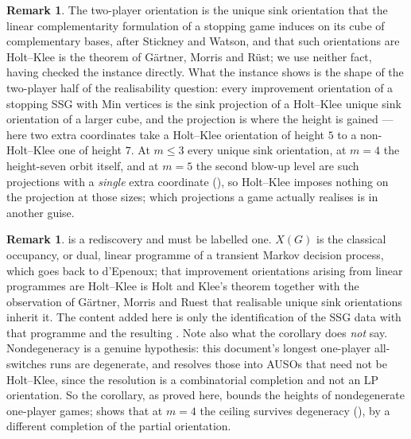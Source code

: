 \documentclass[11pt]{article}
\theoremstyle{plain}
\theoremstyle{definition}
\newtheorem{remark}[theorem]{Remark}
\begin{document}
\begin{remark}\label{rem:gsharp-bigcube}
The two-player orientation is the unique sink orientation that the
linear complementarity formulation of a stopping game induces on its
cube of complementary bases, after Stickney and Watson, and that such
orientations are Holt--Klee is the theorem of G\"artner, Morris and
R\"ust; we use neither fact, having checked the instance directly. What
the instance shows is the shape of the two-player half of the
realisability question: every improvement orientation of a stopping SSG
with Min vertices is the sink projection of a Holt--Klee unique sink
orientation of a larger cube, and the projection is where the height is
gained --- here two extra coordinates take a Holt--Klee orientation of
height $5$ to a non-Holt--Klee one of height $7$. At $m\le3$ every unique sink orientation, at $m=4$ the height-seven
orbit itself, and at $m=5$ the second blow-up level are such projections
with a \emph{single} extra coordinate (), so
Holt--Klee imposes nothing on the projection at those sizes; which
projections a game actually realises is  in
another guise.
\end{remark}

\begin{remark}\label{rem:oneplayer-lp}
 is a rediscovery and must be labelled one. $X(G)$ is
the classical occupancy, or dual, linear programme of a transient Markov
decision process, which goes back to d'Epenoux; that improvement orientations
arising from linear programmes are Holt--Klee is Holt and Klee's theorem
together with the observation of G\"artner, Morris and Ruest that realisable
unique sink orientations inherit it. The content added here is only the
identification of the SSG data with that programme and the resulting
. Note also what the corollary does \emph{not}
say. Nondegeneracy is a genuine hypothesis: this document's longest
one-player all-switches runs are degenerate, and 
resolves those into AUSOs that need not be Holt--Klee, since the resolution
is a combinatorial completion and not an LP orientation. So the corollary, as proved here, bounds the heights of nondegenerate
one-player games;  shows that at $m=4$ the ceiling survives
degeneracy (), by a different completion of the partial
orientation.
\end{remark}
\end{document}
